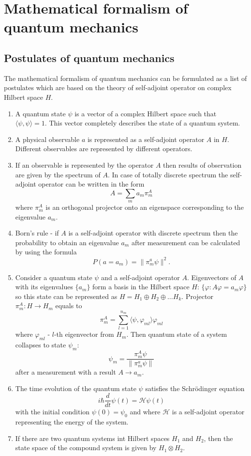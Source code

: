 \documentclass[11pt]{article}
\begin{document}
\section{Mathematical formalism of quantum mechanics}
\subsection{Postulates of quantum mechanics }
The mathematical formalism of quantum mechanics can be formulated as a list of postulates \cite{Khrennikov_information} which are based on the theory of self-adjoint operator on complex Hilbert space $H$. 
\begin{enumerate}[label=\bfseries Postulate \arabic*:, align=left]
  \item A quantum state $\psi$ is a vector of a complex Hilbert space such that $\langle\psi, \psi\rangle = 1$. This vector completely describes the state of a quantum system.
  \item A physical observable $a$ is represented as a self-adjoint operator $A$ in $H$. Different observables are represented by different operators.
  \item If an observable is represented by the operator $A$ then results of observation are given by the spectrum of $A$. In case of totally discrete spectrum the self-adjoint operator can be written in the form 
  \[
  A = \sum_m a_m\pi_m^A
  \]
    where $\pi_m^A$ is an orthogonal projector onto an eigenspace corresponding to the eigenvalue $a_m$.
  \item Born's rule - if $A$ is a self-adjoint operator with discrete spectrum then the probability to obtain an eigenvalue $a_m$ after measurement can be calculated by using the formula
  \[
  P(a = a_m) = \| \pi_m^a\psi\|^2.
  \]
  \item 
  Consider a quantum state $\psi$ and a self-adjoint operator $A$. Eigenvectors of $A$ with its eigenvalues $\{a_m\}$ form a basis in the Hilbert space $H$: $\{ \varphi: A\varphi = a_m\varphi\}$ so this state can be represented as $H = H_1\oplus H_2\oplus\ldots H_k$. Projector $\pi_m^A: H\to H_m$ equals to 
  \[
  \pi_m^A = \sum_{l = 1}^{n_m}\langle\psi,\varphi_{ml}\rangle\varphi_{ml}
  \]
  where $\varphi_{ml}$ - $l$-th eigenvector from $H_m$.
  Then quantum state of a system collapses to state $\psi_m$:
  \[
  \psi_m = \frac{\pi_m^A\psi}{ \| \pi_m^a\psi\|}
  \] 
  after a measurement with a result $A \to a_m$.
  \item The time evolution of the quantum state $\psi$ satisfies the Schr\"{o}dinger equation
  \[
  i\hbar \dfrac{d}{dt}\psi(t) = \mathcal{\mathcal{H}}\psi(t)
  \] 
  with the initial condition $\psi(0) = \psi_0$ and
  where $\mathcal{H}$ is a self-adjoint operator representing the energy of the system.
  \item If there are two quantum systems int Hilbert spaces $H_1$ and $H_2$, then the state space of the compound system is given by $H_1 \otimes H_2$.  
\end{enumerate}
\end{document}
